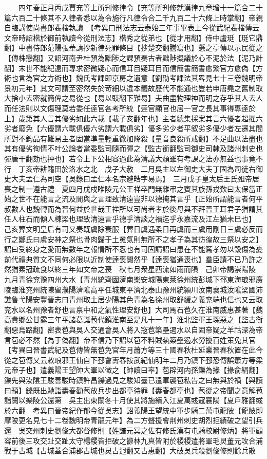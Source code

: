 　　四年春正月丙戌賈充等上所刋修律令【充等所刋修就漢律九章增十一篇合二十篇六百二十條其不入律者悉以為令施行凡律令合二千九百二十六條上時掌翻】帝親自臨講使尚書郎裴楷執讀　【考異曰刑法志云泰始三年事畢表上今從武紀裴楷傳云文帝時詔楷於御前執讀今從刑法志】楷秀之從弟也【從才用翻】侍中盧珽【珽它鼎翻】中書侍郎范陽張華請抄新律死罪條目【抄楚交翻謄寫也】懸之亭傳以示民從之【傳株戀翻】又詔河南尹杜預為黜陟之課預奏古者黜陟擬議於心不泥於法【泥乃計翻】末世不能紀遠而專求密微疑心而信耳目疑耳目而信簡書簡書愈繁官方愈偽【方術也言為官之方術也】魏氏考課即京房之遺意【劉劭考課法其畧見七十三卷魏明帝景初元年】其文可謂至密然失於苛細以違本體故歷代不能通也豈若申唐堯之舊制取大捨小去密就簡俾之易從也【易以豉翻下難易】夫曲盡物理神而明之存乎其人去人而任法則以文傷理莫若委任逹官各考所統【逹官顯官也居一官之長其事得專逹於上】歲第其人言其優劣如此六載【載子亥翻年也】主者總集採案其言六優者超擢六劣者廢免【六優謂六載俱優六劣謂六載俱劣】優多劣少者平叙劣多優少者左遷其間所對不鈞品有難易主者固當凖量輕重微加降殺【量音良殺所戒翻】不足曲以法盡也其有優劣徇情不叶公論者當委監司隨而彈之【監古銜翻監司御史司隸及諸州刺史也彈唐干翻劾也抨也】若令上下公相容過此為清議大頹雖有考課之法亦無益也事竟不行　丁亥帝耕籍田於洛水之北　戊子大赦　二月吳主以左御史大夫丁固為司徒右御史大夫孟仁為司空【吳錄曰孟仁本名宗避皓字易焉】　三月戊子皇太后王氏殂帝居喪之制一遵古禮　夏四月戊戍睢陵元公王祥卒門無雜弔之賓其族孫戎歎曰太保當正始之世不在能言之流及閒與之言理致清遠豈非以德掩其言乎【正始所謂能言者何平叔數人也魏轉而為晉何益於世哉王祥所以可尚者孝於後母與不拜晉王耳君子猶謂其任人柱石而傾人棟梁也理致清遠言乎德乎清談之禍迄乎永嘉流及江左猶未巳也】　己亥葬文明皇后有司又奏既虞除衰服【葬日虞遇柔日再虞而三虞用剛日三虞必反而行之鄭氏曰虞安神之祭也骨肉歸于土䰟氣則無所不之孝子為其彷徨故三祭以安之】詔曰受終身之愛而無數年之報情所不忍也有司固請詔曰患在不能篤孝勿以毁傷為憂前代禮典質文不同何必限以近制使逹喪闕然乎【逹喪猶通喪也】羣臣請不已乃許之然猶素冠疏食以終三年如文帝之喪　秋七月衆星西流如雨而隕　己卯帝謁崇陽陵　九月青徐兖豫四州大水【青州統齊國濟南樂安城陽東萊徐州統彭城下邳東海琅邪廣陵臨淮兖州統陳留濮陽濟隂高平任城東平濟北泰山豫州統潁川汝南襄城汝隂梁國沛譙魯弋陽安豐晉志曰青州取土居少陽其色青為名徐州取舒緩之義兖端也信也又云取兖水以名州豫者舒也言禀中和之氣性理安舒也】大司馬石苞久在淮南威惠甚著【魏高貴鄉公甘露三年平諸葛誕苞代鎮淮南至是凡十一年】淮北監軍王琛惡之【監古䘖翻惡烏路翻】密表苞與吳人交通會吳人將入宼苞築壘遏水以自固帝疑之羊祜深為帝言苞必不然【為于偽翻】帝不信乃下詔以苞不料賊埶築壘遏水勞擾百姓策免其官　【考異曰晉書武紀及苞傳皆無苞免官年月蕭方等三十國春秋杜延業晉春秋置在此今從之苞傳又云敕琅邪王伷自下邳會夀春按武紀伷明年二月乃鎮下邳恐傳誤蕭方等梁元帝子也】遣義陽王望帥大軍以徵之【帥讀曰率】苞辟河内孫鑠為掾【掾俞絹翻】鑠先與汝隂王駿善駿時鎮許昌鑠過見之駿知臺已遣軍襲苞私告之曰無與於禍【與讀曰預】鑠既出馳詣夀春勸苞放兵步出都亭待罪【夀春都亭也】苞從之帝聞之意解苞詣闕以樂陵公還第　吳主出東關冬十月使其將施績入江夏萬彧寇襄陽【夏戶雅翻彧於六翻　考異曰晉帝紀作郁今從吳志】詔義陽王望統中軍步騎二萬屯龍陂【龍陂即摩陂更名見七十二卷魏明帝青龍元年】為二方聲援會荆州刺史胡烈拒績破之望引兵還　吳交州刺史劉俊大都督修則【姓譜元冥之佐有修氏漢有屯騎校尉修炳】將軍顧容前後三攻交趾交趾太守楊稷皆拒破之鬰林九真皆附於稷稷遣將軍毛炅董元攻合浦戰于古城【古城蓋合浦郡古城也炅古迥翻又古惠翻】大破吳兵殺劉俊修則餘兵散